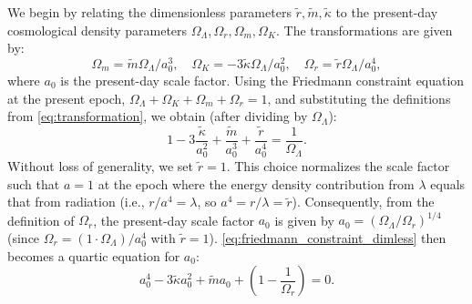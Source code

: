 We begin by relating the dimensionless parameters $\tilde r, \tilde m, \tilde \kappa$ to the present-day cosmological density parameters $\Omega_\Lambda, \Omega_r, \Omega_m, \Omega_K$. %
The transformations are given by:
\begin{equation}\label{eq:transformation}
    \Omega_m=\tilde m\Omega_\Lambda/a_0^3,\quad \Omega_K=-3\tilde \kappa\Omega_\Lambda/a_0^2,\quad \Omega_r=\tilde r\Omega_\Lambda/a_0^4,
\end{equation}
where $a_0$ is the present-day scale factor.
Using the Friedmann constraint equation at the present epoch, $\Omega_\Lambda+\Omega_K+\Omega_m+\Omega_r=1$, and substituting the definitions from \cref{eq:transformation}, we obtain (after dividing by $\Omega_\Lambda$): %
\begin{equation}\label{eq:friedmann_constraint_dimless}
    1-3\frac{\tilde\kappa}{a_0^2}+\frac{\tilde m}{a_0^3}+\frac{\tilde r}{a_0^4}=\frac{1}{\Omega_\Lambda}.
\end{equation}
Without loss of generality, we set $\tilde r=1$. This choice normalizes the scale factor such that $a=1$ at the epoch where the energy density contribution from $\lambda$ equals that from radiation (i.e., $r/a^4 = \lambda$, so $a^4 = r/\lambda = \tilde r$). %
Consequently, from the definition of $\Omega_r$, the present-day scale factor $a_0$ is given by $a_0=(\Omega_\Lambda/\Omega_r)^{1/4}$ (since $\Omega_r = (1 \cdot \Omega_\Lambda)/a_0^4$ with $\tilde r=1$).
\cref{eq:friedmann_constraint_dimless} then becomes a quartic equation for $a_0$: %
\[
a_0^4 -3\tilde\kappa a_0^2+\tilde ma_0 +\left(1-\frac{1}{\Omega_r}\right)=0. %
\]
